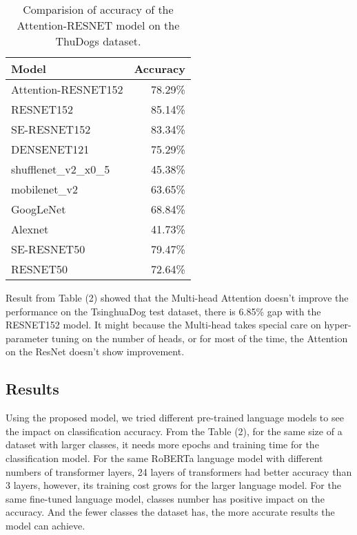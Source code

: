 \documentclass[10pt,twocolumn,letterpaper]{article}
\begin{document}
\begin{table}
\begin{center}
\begin{tabular}{|l|r|}
\hline
Model   & Accuracy \\
\hline\hline
Attention-RESNET152 &  	78.29\% \\
RESNET152  	&	85.14\% \\
SE-RESNET152  	&	83.34\% \\
\hline
DENSENET121   	&	75.29\% \\
shufflenet\_v2\_x0\_5  &	45.38\% \\
\hline
mobilenet\_v2 & 63.65\%\\
GoogLeNet & 68.84\%\\
Alexnet & 41.73\%\\
\hline
SE-RESNET50 & 79.47\% \\
RESNET50 & 72.64\%\\

\hline
\end{tabular}
\end{center}
\caption{Comparision of accuracy of the Attention-RESNET model on the ThuDogs dataset.}
\end{table}

Result from Table (2) showed that the Multi-head Attention doesn't improve the performance on the TsinghuaDog test dataset, there is 6.85\% gap with the RESNET152 model.
It might because the Multi-head takes special care on hyper-parameter tuning on the number of heads, or for most of the time, the Attention on the ResNet doesn't show improvement.

\subsection{Results}

Using the proposed model, we tried different pre-trained language models to see the impact on classification accuracy.
From the Table (2), for the same size of a dataset with larger classes, it needs more epochs and training time for the classification model.
For the same RoBERTa language model with different numbers of transformer layers, 24 layers of transformers had better accuracy than 3 layers,
however, its training cost grows for the larger language model.
For the same fine-tuned language model, classes number has positive impact on the accuracy.
And the fewer classes the dataset has, the more accurate results the model can achieve.
\end{document}
